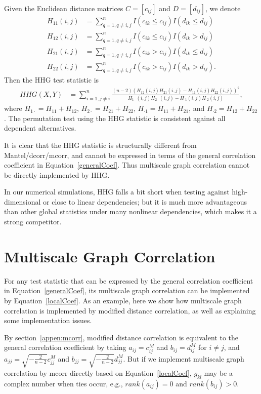 \documentclass[11pt]{article}
\begin{document}
Given the Euclidean distance matrices $C=[c_{ij}]$ and $D=[d_{ij}]$, we denote
\begin{align*}
H_{11}(i,j) &= \sum_{q=1,q\neq i,j}^{n}I(c_{ik} \leq c_{ij})I(d_{ik} \leq d_{ij}) \\
H_{12}(i,j) &= \sum_{q=1,q\neq i,j}^{n}I(c_{ik} \leq c_{ij})I(d_{ik} > d_{ij}) \\
H_{21}(i,j) &= \sum_{q=1,q\neq i,j}^{n}I(c_{ik} > c_{ij})I(d_{ik} \leq d_{ij}) \\
H_{22}(i,j) &= \sum_{q=1,q\neq i,j}^{n}I(c_{ik} > c_{ij})I(d_{ik} > d_{ij}).
\end{align*}
Then the HHG test statistic is
\begin{align*}
HHG(X,Y) &= \sum_{i=1,j\neq i}^{n} \frac{(n-2)(H_{12}(i,j)H_{21}(i,j)-H_{11}(i,j)H_{22}(i,j))^2}{H_{1 \cdot}(i,j)H_{2 \cdot}(i,j)-H_{\cdot 1}(i,j)H_{\cdot 2}(i,j)},
\end{align*}
where $H_{1 \cdot}=H_{11}+H_{12}$, $H_{2 \cdot}=H_{21}+H_{22}$, $H_{\cdot 1}=H_{11}+H_{21}$, and $H_{\cdot 2}=H_{12}+H_{22}$. The permutation test using the HHG statistic is consistent against all dependent alternatives.

It is clear that the HHG statistic is structurally different from Mantel/dcorr/mcorr, and cannot be expressed in terms of the general correlation coefficient in Equation~\ref{generalCoef}. Thus multiscale graph correlation cannot be directly implemented by HHG.

In our numerical simulations, HHG falls a bit short when testing against high-dimensional or close to linear dependencies; but it is much more advantageous than other global statistics under many nonlinear dependencies, which makes it a strong competitor. %

\section{Multiscale Graph Correlation}
\label{appen:MGC}

For any test statistic that can be expressed by the general correlation coefficient in Equation~\ref{generalCoef}, its multiscale graph correlation can be implemented by Equation~\ref{localCoef}. As an example, here we show how multiscale graph correlation is implemented by modified distance correlation, as well as explaining some implementation issues.

By section~\ref{appen:mcorr}, modified distance correlation is equivalent to the general correlation coefficient by taking $a_{ij}=c^{M}_{ij}$ and $b_{ij}=d^{M}_{ij}$ for $i \neq j$, and $a_{jj}=\sqrt{-\frac{2}{n-2}}c^{M}_{jj}$ and $b_{jj}=\sqrt{-\frac{2}{n-2}}d^{M}_{jj}$. But if we implement multiscale graph correlation by mcorr directly based on Equation~\ref{localCoef}, $g_{kl}$ may be a complex number when ties occur, e.g., $rank(a_{ij})=0$ and $rank(b_{ij})>0$.
\end{document}
